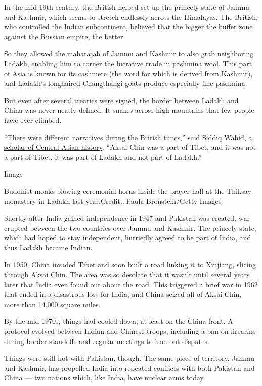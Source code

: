 In the mid-19th century, the British helped set up the princely state of
Jammu and Kashmir, which seems to stretch endlessly across the
Himalayas. The British, who controlled the Indian subcontinent, believed
that the bigger the buffer zone against the Russian empire, the better.

So they allowed the maharajah of Jammu and Kashmir to also grab
neighboring Ladakh, enabling him to corner the lucrative trade in
pashmina wool. This part of Asia is known for its cashmere (the word for
which is derived from Kashmir), and Ladakh's longhaired Changthangi
goats produce especially fine pashmina.

But even after several treaties were signed, the border between Ladakh
and China was never neatly defined. It snakes across high mountains that
few people have ever climbed.

``There were different narratives during the British times,'' said
\href{https://thewire.in/diplomacy/global-dimension-india-china-confrontation-in-ladakh}{Siddiq
Wahid, a scholar of Central Asian history}. ``Aksai Chin was a part of
Tibet, and it was not a part of Tibet, it was part of Ladakh and not
part of Ladakh.''

Image

Buddhist monks blowing ceremonial horns inside the prayer hall at the
Thiksay monastery in Ladakh last year.Credit...Paula Bronstein/Getty
Images

Shortly after India gained independence in 1947 and Pakistan was
created, war erupted between the two countries over Jammu and Kashmir.
The princely state, which had hoped to stay independent, hurriedly
agreed to be part of India, and thus Ladakh became Indian.

In 1950, China invaded Tibet and soon built a road linking it to
Xinjiang, slicing through Aksai Chin. The area was so desolate that it
wasn't until several years later that India even found out about the
road. This triggered a brief war in 1962 that ended in a disastrous loss
for India, and China seized all of Aksai Chin, more than 14,000 square
miles.

By the mid-1970s, things had cooled down, at least on the China front. A
protocol evolved between Indian and Chinese troops, including a ban on
firearms during border standoffs and regular meetings to iron out
disputes.

Things were still hot with Pakistan, though. The same piece of
territory, Jammu and Kashmir, has propelled India into repeated
conflicts with both Pakistan and China --- two nations which, like
India, have nuclear arms today.

